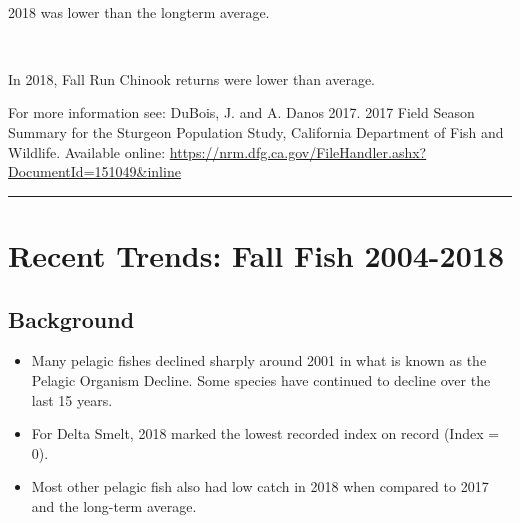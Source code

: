 \documentclass[
]{book}
\providecommand{\tightlist}{%
  \setlength{\itemsep}{0pt}\setlength{\parskip}{0pt}}
\begin{document}
\begin{panel-grid}
\begin{columns-nocenter}
\begin{column40}

~

\end{column40}

\begin{column800}

2018 was lower than the longterm average.

\end{column800}

\begin{column40}

~

\end{column40}

\begin{column800}

In 2018, Fall Run Chinook returns were lower than average.

\end{column800}

\end{columns-nocenter}

\end{panel-grid}

\begin{disclaimer}
For more information see: DuBois, J. and A. Danos 2017. 2017 Field
Season Summary for the Sturgeon Population Study, California Department
of Fish and Wildlife. Available online:
\url{https://nrm.dfg.ca.gov/FileHandler.ashx?DocumentId=151049\&inline}
\end{disclaimer}

\begin{center}\rule{0.5\linewidth}{0.5pt}\end{center}

\hypertarget{recent-trends-fall-fish-2004-2018}{%
\section{Recent Trends: Fall Fish 2004-2018}\label{recent-trends-fall-fish-2004-2018}}

\hypertarget{background-5}{%
\subsection{Background}\label{background-5}}

\begin{itemize}
\tightlist
\item
  Many pelagic fishes declined sharply around 2001 in what is known as the Pelagic Organism Decline. Some species have continued to decline over the last 15 years.
\item
  For Delta Smelt, 2018 marked the lowest recorded index on record (Index = 0).
\item
  Most other pelagic fish also had low catch in 2018 when compared to 2017 and the long-term average.
\end{itemize}
\end{document}
